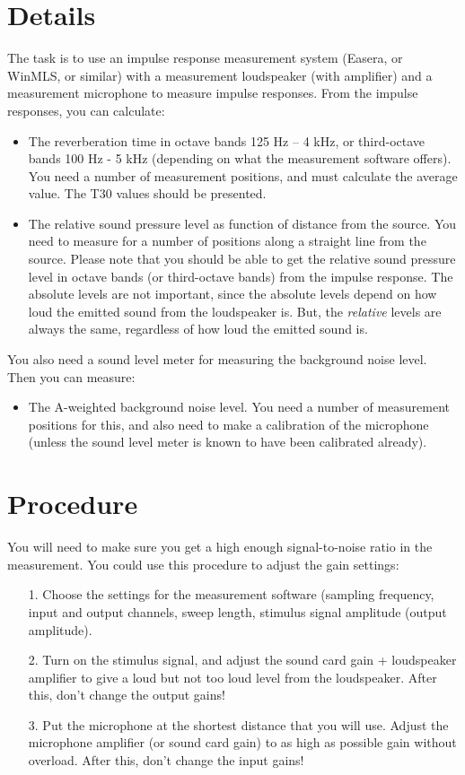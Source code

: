 \documentclass{article}
\begin{document}
\section{Details}
The task is to use an impulse response measurement system (Easera, or WinMLS,
or similar) with a measurement loudspeaker (with amplifier) and a measurement microphone to measure impulse responses. From the impulse responses, you can calculate:

\begin{itemize}
    \item The reverberation time in octave bands 125 Hz – 4 kHz, or third-octave bands 100 Hz - 5 kHz (depending on what the measurement software offers). You need a number of measurement positions, and must calculate the average value. The T30 values should be presented.
    \item The relative sound pressure level as function of distance from the source. You need to measure for a number of positions along a straight line from the source. Please note that you should be able to get the relative sound pressure level in octave bands (or third-octave bands) from the impulse response. The absolute levels are not important, since the absolute levels depend on how loud the emitted sound from the loudspeaker is. But, the {\em relative} levels are always the same, regardless of how loud the emitted sound is.
\end{itemize}
You also need a sound level meter for measuring the background noise level. Then you can measure:
\begin{itemize}
    \item The A-weighted background noise level. You need a number of measurement positions for this, and also need to make a calibration of the microphone (unless the sound level meter is known to have been calibrated already). 
\end{itemize}


\section{Procedure}

You will need to make sure you get a high enough signal-to-noise ratio in the measurement. You could use this procedure to adjust the gain settings:

\begin{itemize}
    \item [1.] Choose the settings for the measurement software (sampling frequency, input and output channels, sweep length, stimulus signal amplitude (output amplitude).
    \item[2.] Turn on the stimulus signal, and adjust the sound card gain + loudspeaker amplifier to give a loud but not too loud level from the loudspeaker. After this, don’t change the output gains!
    \item[3.] Put the microphone at the shortest distance that you will use. Adjust the microphone amplifier (or sound card gain) to as high as possible gain without overload. After this, don’t change the input gains!
\end{itemize}
\end{document}

